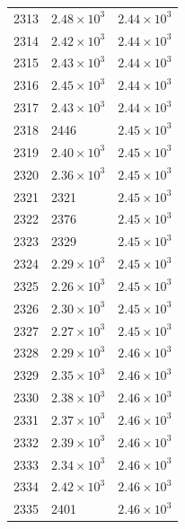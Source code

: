 \begin{table}[H]
\begin{tabular}{lll}
2313 & $\displaystyle 2.48 \times 10^{3}$ & $\displaystyle 2.44 \times 10^{3}$ \\
2314 & $\displaystyle 2.42 \times 10^{3}$ & $\displaystyle 2.44 \times 10^{3}$ \\
2315 & $\displaystyle 2.43 \times 10^{3}$ & $\displaystyle 2.44 \times 10^{3}$ \\
2316 & $\displaystyle 2.45 \times 10^{3}$ & $\displaystyle 2.44 \times 10^{3}$ \\
2317 & $\displaystyle 2.43 \times 10^{3}$ & $\displaystyle 2.44 \times 10^{3}$ \\
2318 & 2446 & $\displaystyle 2.45 \times 10^{3}$ \\
2319 & $\displaystyle 2.40 \times 10^{3}$ & $\displaystyle 2.45 \times 10^{3}$ \\
2320 & $\displaystyle 2.36 \times 10^{3}$ & $\displaystyle 2.45 \times 10^{3}$ \\
2321 & 2321 & $\displaystyle 2.45 \times 10^{3}$ \\
2322 & 2376 & $\displaystyle 2.45 \times 10^{3}$ \\
2323 & 2329 & $\displaystyle 2.45 \times 10^{3}$ \\
2324 & $\displaystyle 2.29 \times 10^{3}$ & $\displaystyle 2.45 \times 10^{3}$ \\
2325 & $\displaystyle 2.26 \times 10^{3}$ & $\displaystyle 2.45 \times 10^{3}$ \\
2326 & $\displaystyle 2.30 \times 10^{3}$ & $\displaystyle 2.45 \times 10^{3}$ \\
2327 & $\displaystyle 2.27 \times 10^{3}$ & $\displaystyle 2.45 \times 10^{3}$ \\
2328 & $\displaystyle 2.29 \times 10^{3}$ & $\displaystyle 2.46 \times 10^{3}$ \\
2329 & $\displaystyle 2.35 \times 10^{3}$ & $\displaystyle 2.46 \times 10^{3}$ \\
2330 & $\displaystyle 2.38 \times 10^{3}$ & $\displaystyle 2.46 \times 10^{3}$ \\
2331 & $\displaystyle 2.37 \times 10^{3}$ & $\displaystyle 2.46 \times 10^{3}$ \\
2332 & $\displaystyle 2.39 \times 10^{3}$ & $\displaystyle 2.46 \times 10^{3}$ \\
2333 & $\displaystyle 2.34 \times 10^{3}$ & $\displaystyle 2.46 \times 10^{3}$ \\
2334 & $\displaystyle 2.42 \times 10^{3}$ & $\displaystyle 2.46 \times 10^{3}$ \\
2335 & 2401 & $\displaystyle 2.46 \times 10^{3}$ \\

\end{tabular}
\end{table}
